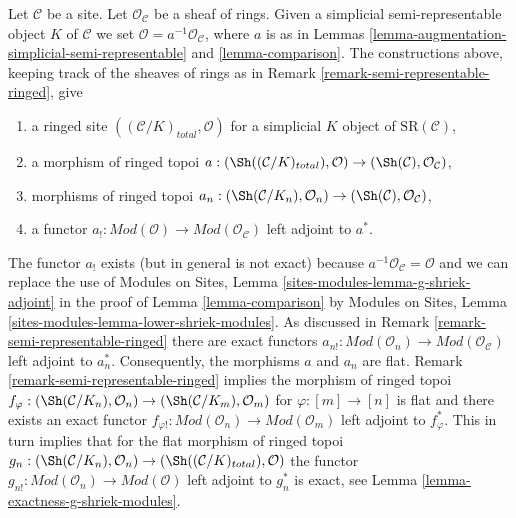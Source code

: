 \begin{remark}
\label{remark-augmentation-ringed}
Let $\mathcal{C}$ be a site. Let $\mathcal{O}_\mathcal{C}$ be a sheaf of rings.
Given a simplicial semi-representable object $K$ of $\mathcal{C}$
we set $\mathcal{O} = a^{-1}\mathcal{O}_\mathcal{C}$, where $a$
is as in Lemmas \ref{lemma-augmentation-simplicial-semi-representable} and
\ref{lemma-comparison}.
The constructions above, keeping track of the sheaves of rings
as in Remark \ref{remark-semi-representable-ringed}, give
\begin{enumerate}
\item a ringed site $((\mathcal{C}/K)_{total}, \mathcal{O})$
for a simplicial $K$ object of $\text{SR}(\mathcal{C})$,
\item a morphism of ringed topoi
$a : (\Sh((\mathcal{C}/K)_{total}), \mathcal{O}) \to
(\Sh(\mathcal{C}), \mathcal{O}_\mathcal{C})$,
\item morphisms of ringed topoi
$a_n : (\Sh(\mathcal{C}/K_n), \mathcal{O}_n) \to
(\Sh(\mathcal{C}), \mathcal{O}_\mathcal{C})$,
\item a functor
$a_! : \textit{Mod}(\mathcal{O}) \to \textit{Mod}(\mathcal{O}_\mathcal{C})$
left adjoint to $a^*$.
\end{enumerate}
The functor $a_!$ exists (but in general is not exact)
because $a^{-1}\mathcal{O}_\mathcal{C} = \mathcal{O}$
and we can replace the use of
Modules on Sites, Lemma \ref{sites-modules-lemma-g-shriek-adjoint}
in the proof of Lemma \ref{lemma-comparison}
by Modules on Sites, Lemma \ref{sites-modules-lemma-lower-shriek-modules}.
As discussed in Remark \ref{remark-semi-representable-ringed}
there are exact functors
$a_{n!} : \textit{Mod}(\mathcal{O}_n) \to
\textit{Mod}(\mathcal{O}_\mathcal{C})$
left adjoint to $a_n^*$. Consequently, the morphisms $a$ and $a_n$ are flat.
Remark \ref{remark-semi-representable-ringed}
implies the morphism of ringed topoi
$f_\varphi : (\Sh(\mathcal{C}/K_n), \mathcal{O}_n) \to
(\Sh(\mathcal{C}/K_m), \mathcal{O}_m)$
for $\varphi : [m] \to [n]$ is flat and there exists an exact functor
$f_{\varphi!} : \textit{Mod}(\mathcal{O}_n) \to \textit{Mod}(\mathcal{O}_m)$
left adjoint to $f_\varphi^*$. This in turn implies that for
the flat morphism of ringed topoi
$g_n : (\Sh(\mathcal{C}/K_n), \mathcal{O}_n) \to
(\Sh((\mathcal{C}/K)_{total}), \mathcal{O})$
the functor $g_{n!} : \textit{Mod}(\mathcal{O}_n) \to
\textit{Mod}(\mathcal{O})$ left adjoint to $g_n^*$ is exact, see
Lemma \ref{lemma-exactness-g-shriek-modules}.
\end{remark}

